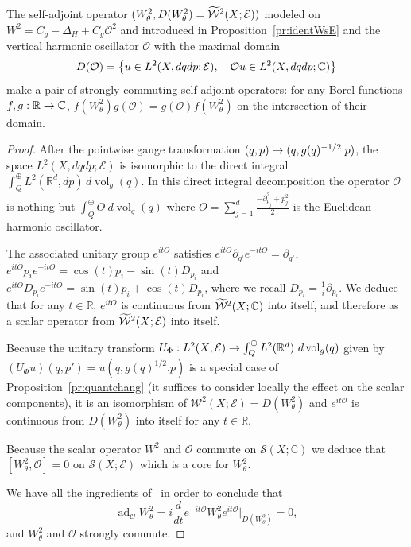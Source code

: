 \documentclass[AHL,Unicode,longabstracts]{cedram}
\newcommand{\C}{\mathbb{C}}
\newcommand{\R}{\mathbb{R}}
\newcommand{\clW}{\mathcal{W}}
\newcommand{\clO}{\mathcal{O}}
\newcommand{\clE}{\mathcal{E}}
\newcommand{\clS}{\mathcal{S}}
\DeclareMathOperator{\voll}{vol}
\DeclareMathOperator{\add}{ad}
\let\oldtilde\tilde
\renewcommand*{\tilde}[1]{\mathchoice{\widetilde{#1}}{\widetilde{#1}}{\oldtilde{#1}}{\oldtilde{#1}}}
\let\originalleft\left
\let\originalright\right
\renewcommand{\left}{\mathopen{}\mathclose\bgroup\originalleft}
\renewcommand{\right}{\aftergroup\egroup\originalright}
\renewcommand*{\to}{\mathchoice{\longrightarrow}{\rightarrow}{\rightarrow}{\rightarrow}}
\let\oldmapsto\mapsto
\renewcommand*{\mapsto}{\mathchoice{\longmapsto}{\oldmapsto}{\oldmapsto}{\oldmapsto}}
\begin{document}
\begin{prop}\label{pr:commut}
The self-adjoint operator $(W^{2}_{\theta},D(W^{2}_{\theta})=\tilde{\clW}^{2}(X;\clE))$ modeled on $W^{2}=C_{g}-\Delta_{H}+C_{g}\clO^{2}$ and introduced in Proposition~\ref{pr:identWsE} and the vertical harmonic oscillator $\clO$ with the maximal domain
\[
D(\clO)=\left\{u\in L^{2}(X,dqdp;\clE),\quad \clO u\in L^{2}(X,dqdp;\C)\right\}
\]
make a pair of strongly commuting self-adjoint operators: for any Borel functions $f,g:\R\to \C$, $f(W^{2}_{\theta})g(\clO)=g(\clO)f(W^{2}_{\theta})$ on the intersection of their domain.
\end{prop}

\begin{proof}
After the pointwise gauge transformation $(q,p)\mapsto (q,g(q)^{-1/2}.p)$, the space $L^{2}(X,dqdp;\clE)$ is isomorphic to the direct integral $\int_{Q}^{\oplus}L^{2}(\R^{d},dp)\,d\voll_{g}(q)$. In this direct integral decomposition the operator $\clO$ is nothing but $\int_{Q}^{\oplus}O~d\voll_{g}(q)$ where $O=\sum_{j=1}^{d}\frac{-\partial_{p_{j}}^{2}+p_{j}^{2}}{2}$ is the Euclidean harmonic oscillator.

The associated unitary group $e^{itO}$ satisfies $e^{itO}\partial_{q^{i}}e^{-itO}\!=\partial_{q^{i}}$, $e^{itO}p_{i}e^{-itO}\!=\cos(t)p_{i}-\sin(t)D_{p_{i}}$ and $e^{itO}D_{p_{i}}e^{-itO}=\sin(t)p_{i}+\cos(t)D_{p_{i}}$, where we recall $D_{p_i} = \frac{1}{i}\partial_{p_i}$. We deduce that for any $t\in \R$, $e^{itO}$ is continuous from $\tilde{\clW}^{2}(X;\C)$ into itself, and therefore as a scalar operator from $\tilde{\clW}^{2}(X;\clE)$ into itself.

Because the unitary transform $U_{\Phi}:L^{2}(X;\clE)\to \int_{Q}^{\oplus}L^{2}(\R^{d})~d\voll_{g}(q)$ given by $(U_{\Phi}u)(q,p')=u(q,g(q)^{1/2}.p)$ is a special case of Proposition~\ref{pr:quantchang} (it suffices to consider locally the effect on the scalar components), it is an isomorphism of $\clW^{2}(X;\clE)=D(W^{2}_{\theta})$ and $e^{it\clO}$ is continuous from $D(W^{2}_{\theta})$ into itself for any $t\in \R$.

Because the scalar operator $W^{2}$ and $\clO$ commute on $\clS(X;\C)$ we deduce that $[W^{2}_{\theta},\clO]=0$ on $\clS(X;\clE)$ which is a core for $W^{2}_{\theta}$.

We have all the ingredients of~\cite{ABG} in order to conclude that
\[
\add_{\clO}W^{2}_{\theta}=i\frac{d}{dt}e^{-it\clO}W_{\theta}^{2}e^{it\clO}\big|_{D(W^{2}_{\theta})}=0,
\]
and $W^{2}_{\theta}$ and $\clO$ strongly commute.
\end{proof}
\end{document}
